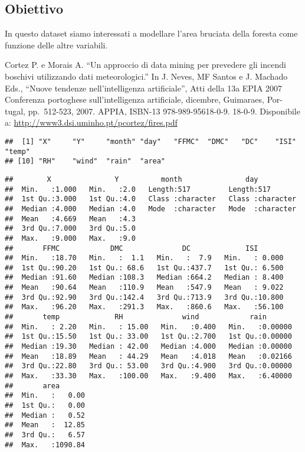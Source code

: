 \documentclass[
]{article}
\begin{document}
\hypertarget{obiettivo}{%
\subsection{Obiettivo}\label{obiettivo}}

In questo dataset siamo interessati a modellare l'area bruciata della
foresta come funzione delle altre variabili.

Cortez P. e Morais A. ``Un approccio di data mining per prevedere gli
incendi boschivi utilizzando dati meteorologici.'' In J. Neves, MF
Santos e J. Machado Eds., ``Nuove tendenze nell'intelligenza
artificiale'', Atti della 13a EPIA 2007 Conferenza portoghese
sull'intelligenza artificiale, dicembre, Guimaraes, Por- tugal,
pp.~512-523, 2007. APPIA, ISBN-13 978-989-95618-0-9. 18-0-9. Disponibile
a: \url{http://www3.dsi.uminho.pt/pcortez/fires.pdf}

\begin{verbatim}
##  [1] "X"     "Y"     "month" "day"   "FFMC"  "DMC"   "DC"    "ISI"   "temp" 
## [10] "RH"    "wind"  "rain"  "area"
\end{verbatim}

\begin{verbatim}
##        X               Y          month               day           
##  Min.   :1.000   Min.   :2.0   Length:517         Length:517        
##  1st Qu.:3.000   1st Qu.:4.0   Class :character   Class :character  
##  Median :4.000   Median :4.0   Mode  :character   Mode  :character  
##  Mean   :4.669   Mean   :4.3                                        
##  3rd Qu.:7.000   3rd Qu.:5.0                                        
##  Max.   :9.000   Max.   :9.0                                        
##       FFMC            DMC              DC             ISI        
##  Min.   :18.70   Min.   :  1.1   Min.   :  7.9   Min.   : 0.000  
##  1st Qu.:90.20   1st Qu.: 68.6   1st Qu.:437.7   1st Qu.: 6.500  
##  Median :91.60   Median :108.3   Median :664.2   Median : 8.400  
##  Mean   :90.64   Mean   :110.9   Mean   :547.9   Mean   : 9.022  
##  3rd Qu.:92.90   3rd Qu.:142.4   3rd Qu.:713.9   3rd Qu.:10.800  
##  Max.   :96.20   Max.   :291.3   Max.   :860.6   Max.   :56.100  
##       temp             RH              wind            rain        
##  Min.   : 2.20   Min.   : 15.00   Min.   :0.400   Min.   :0.00000  
##  1st Qu.:15.50   1st Qu.: 33.00   1st Qu.:2.700   1st Qu.:0.00000  
##  Median :19.30   Median : 42.00   Median :4.000   Median :0.00000  
##  Mean   :18.89   Mean   : 44.29   Mean   :4.018   Mean   :0.02166  
##  3rd Qu.:22.80   3rd Qu.: 53.00   3rd Qu.:4.900   3rd Qu.:0.00000  
##  Max.   :33.30   Max.   :100.00   Max.   :9.400   Max.   :6.40000  
##       area        
##  Min.   :   0.00  
##  1st Qu.:   0.00  
##  Median :   0.52  
##  Mean   :  12.85  
##  3rd Qu.:   6.57  
##  Max.   :1090.84
\end{verbatim}
\end{document}

